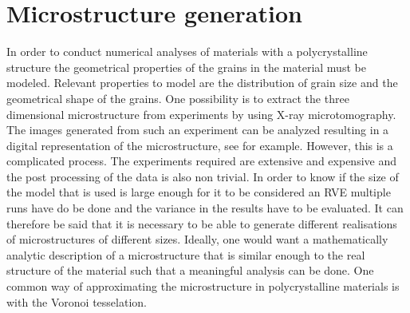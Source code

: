 \documentclass[micro_gen.tex]{subfiles}
\begin{document}
\chapter{Microstructure generation}

In order to conduct numerical analyses of materials with a polycrystalline structure the geometrical properties of the grains in the material must be modeled. Relevant properties to model are the distribution of grain size and the geometrical shape of the grains.
One possibility is to extract the three dimensional microstructure from experiments by using X-ray microtomography. 
The images generated from such an experiment can be analyzed resulting in a digital representation of the microstructure, see for example\cite{Bhandari2007222}.
However, this is a complicated process. The experiments required are extensive and expensive and the post processing of the data is also non trivial. 
 In order to know if the size of the model that is used is large enough for it to be considered an RVE multiple runs have do be done and the variance in the results have to be evaluated. It can therefore be said that it is necessary to be able to generate different realisations of microstructures of different sizes. Ideally, one would want a mathematically analytic description of a microstructure that is similar enough to the real structure of the material such that a meaningful analysis can be done. One common way of approximating the microstructure in polycrystalline materials is with the Voronoi tesselation. 
 
\end{document}
